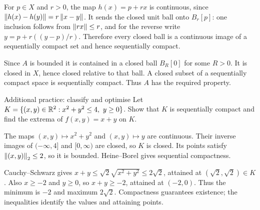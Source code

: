 \begin{answer}
For $p\in X$ and $r>0$, the map $h(x)=p+rx$ is continuous, since $\left\lVert h(x)-h(y)\right\rVert=r\left\lVert x-y\right\rVert$. It sends the closed unit ball onto $B_r[p]$: one inclusion follows from $\left\lVert rx\right\rVert\le r$, and for the reverse write $y=p+r((y-p)/r)$. Therefore every closed ball is a continuous image of a sequentially compact set and hence sequentially compact.

Since $A$ is bounded it is contained in a closed ball $B_R[0]$ for some $R>0$. It is closed in $X$, hence closed relative to that ball. A closed subset of a sequentially compact space is sequentially compact. Thus $A$ has the required property.
\end{answer}
\begin{exam}{Additional practice: classify and optimise}
Let $K=\{(x,y)\in\mathbb R^2:x^2+y^2\le4,\ y\ge0\}$. Show that $K$ is sequentially compact and find the extrema of $f(x,y)=x+y$ on $K$.
\end{exam}
\begin{answer}
The maps $(x,y)\mapsto x^2+y^2$ and $(x,y)\mapsto y$ are continuous. Their inverse images of $(-\infty,4]$ and $[0,\infty)$ are closed, so $K$ is closed. Its points satisfy $\left\lVert(x,y)\right\rVert_2\le2$, so it is bounded. Heine--Borel gives sequential compactness.

Cauchy--Schwarz gives $x+y\le\sqrt2\sqrt{x^2+y^2}\le2\sqrt2$, attained at $(\sqrt2,\sqrt2)\in K$. Also $x\ge-2$ and $y\ge0$, so $x+y\ge-2$, attained at $(-2,0)$. Thus the minimum is $-2$ and maximum $2\sqrt2$. Compactness guarantees existence; the inequalities identify the values and attaining points.
\end{answer}


